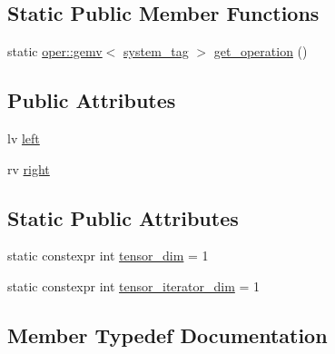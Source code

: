 \subsection*{Static Public Member Functions}
\begin{DoxyCompactItemize}
\item 
static \hyperlink{structbc_1_1oper_1_1gemv}{oper\+::gemv}$<$ \hyperlink{structbc_1_1tensors_1_1exprs_1_1Bin__Op_3_01oper_1_1gemv_3_01SystemTag_01_4_00_01lv_00_01rv_01_4_a18ec8659904c80f74cf3c865349e0785}{system\+\_\+tag} $>$ \hyperlink{structbc_1_1tensors_1_1exprs_1_1Bin__Op_3_01oper_1_1gemv_3_01SystemTag_01_4_00_01lv_00_01rv_01_4_aa6172a36f7b36dc1889faf5e48709234}{get\+\_\+operation} ()
\end{DoxyCompactItemize}
\subsection*{Public Attributes}
\begin{DoxyCompactItemize}
\item 
lv \hyperlink{structbc_1_1tensors_1_1exprs_1_1Bin__Op_3_01oper_1_1gemv_3_01SystemTag_01_4_00_01lv_00_01rv_01_4_acf8a343150aa94e049e4256aa2e543d8}{left}
\item 
rv \hyperlink{structbc_1_1tensors_1_1exprs_1_1Bin__Op_3_01oper_1_1gemv_3_01SystemTag_01_4_00_01lv_00_01rv_01_4_a03a8bea78fcc4829df216da0e407a634}{right}
\end{DoxyCompactItemize}
\subsection*{Static Public Attributes}
\begin{DoxyCompactItemize}
\item 
static constexpr int \hyperlink{structbc_1_1tensors_1_1exprs_1_1Bin__Op_3_01oper_1_1gemv_3_01SystemTag_01_4_00_01lv_00_01rv_01_4_a5ee5c04316c9a6a67248e7920aaf07bd}{tensor\+\_\+dim} = 1
\item 
static constexpr int \hyperlink{structbc_1_1tensors_1_1exprs_1_1Bin__Op_3_01oper_1_1gemv_3_01SystemTag_01_4_00_01lv_00_01rv_01_4_af30c95fbafd6a6d93707f45f3028beb9}{tensor\+\_\+iterator\+\_\+dim} = 1
\end{DoxyCompactItemize}


\subsection{Member Typedef Documentation}
\mbox{\label{structbc_1_1tensors_1_1exprs_1_1Bin__Op_3_01oper_1_1gemv_3_01SystemTag_01_4_00_01lv_00_01rv_01_4_a18ec8659904c80f74cf3c865349e0785}} 
